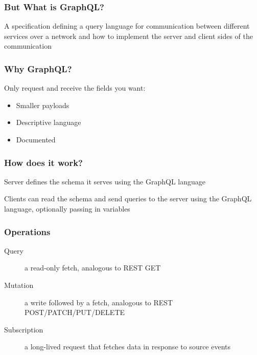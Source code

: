 \documentclass[notes]{beamer}
\begin{document}
\begin{frame}
  \frametitle{But What is GraphQL?}  A specification defining a query
  language for communication between different services over a network
  and how to implement the server and client sides of the
  communication
\end{frame}


\begin{frame}
  \frametitle{Why GraphQL?}  Only request and receive the fields you
  want:
  \begin{itemize}
  \item Smaller payloads
  \item Descriptive language
  \item Documented
  \end{itemize}
\end{frame}


\begin{frame}
  \frametitle{How does it work?}  Server defines the schema it serves
  using the GraphQL language

  Clients can read the schema and send queries to the server using the
  GraphQL language, optionally passing in variables
\end{frame}


\begin{frame}
  \frametitle{Operations}
  \begin{description}
  \item[Query] a read-only fetch, analogous to REST GET
  \item[Mutation] a write followed by a fetch, analogous to REST
    POST/PATCH/PUT/DELETE
  \item[Subscription] a long-lived request that fetches data in
    response to source events
  \end{description}
\end{frame}
\end{document}
